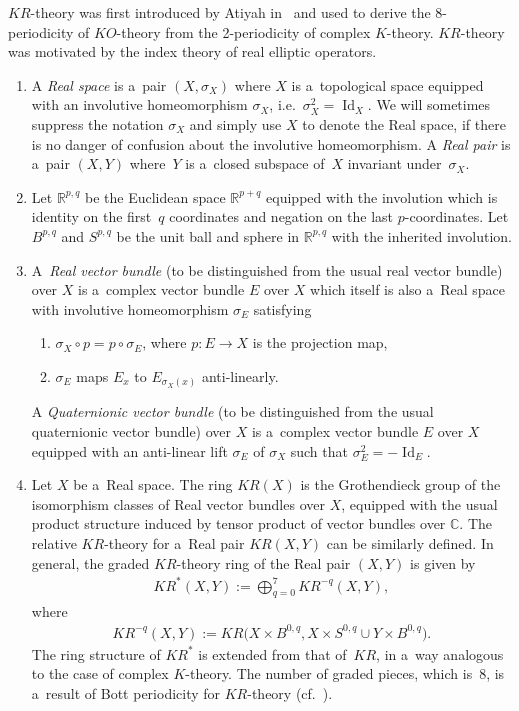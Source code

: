 \documentclass[pdftex]{sigma}
\numberwithin{equation}{section}
\DeclareMathOperator{\Id}{Id}
\begin{document}
$KR$-theory was f\/irst introduced by Atiyah in~\cite{At3} and used to derive the 8-periodicity of $KO$-theory from the
2-periodicity of complex $K$-theory.
$KR$-theory was motivated by the index theory of real elliptic operators.
\begin{Definition}\label{krtheory}\quad
\begin{enumerate}\itemsep=0pt
\item
A \emph{Real space} is a~pair $(X,
\sigma_X)$ where $X$ is a~topological space equipped with an involutive homeomorphism $\sigma_X$, i.e.\
$\sigma_X^2=\Id
_X$.
We will sometimes suppress the notation $\sigma_X$ and simply use $X$ to denote the Real space,
if there is no danger of confusion about the involutive
homeomorphism.
A \emph{Real pair}
is a~pair $(X, Y)$ where~$Y$ is a~closed subspace of~$X$ invariant under~$\sigma_X$.
\item
Let $\mathbb{R}^{p, q}$ be the Euclidean space $\mathbb{R}^{p+q}$
equipped with the involution which is identity on the f\/irst~$q$
coordinates and negation on the last $p$-coordinates.
Let $B^{p, q}$ and $S^{p, q}$ be the unit ball and sphere in $\mathbb{R}^{p, q}$ with the inherited involution.
\item
A~\emph{Real vector bundle}
(to be distinguished from the usual real vector bundle) over $X$ is a~complex vector bundle
$E$ over $X$ which itself is also a~Real space with involutive homeomorphism $\sigma_E$ satisfying
\begin{enumerate}\itemsep=0pt
\item
$\sigma_X\circ p=p\circ\sigma_E$, where $p: E\to X$ is the projection map,
\item
$\sigma_E$ maps $E_x$ to $E_{\sigma_X(x)}$ anti-linearly.
\end{enumerate}
A \emph{Quaternionic vector bundle}
(to be distinguished from the usual quaternionic vector bundle) over $X$ is a~complex
vector bundle $E$ over $X$ equipped with an anti-linear lift $\sigma_E$ of $\sigma_X$ such that $\sigma_E^2=-\Id
_E$.
\item
Let $X$ be a~Real space.
The ring $KR(X)$ is the Grothendieck group of the isomorphism classes of Real vector bundles over $X$, equipped with the
usual product structure induced by tensor product of vector bundles over $\mathbb{C}$.
The relative $KR$-theory for a~Real pair $KR(X, Y)$ can be similarly def\/ined.
In general, the graded $KR$-theory ring of the Real pair $(X, Y)$ is given by
\begin{gather*}
KR^*(X, Y):=\bigoplus_{q=0}^7 KR^{-q}(X, Y),
\end{gather*}
where
\begin{gather*}
KR^{-q}(X, Y):=KR\big(X\times B^{0,q}, X\times S^{0, q}\cup Y\times B^{0,q}\big).
\end{gather*}
The ring structure of $KR^*$ is extended from that of~$KR$, in a~way analogous to the case of complex $K$-theory.
The number of graded pieces, which is~8, is a~result of Bott periodicity for $KR$-theory (cf.~\cite{At3}).
\end{enumerate}
\end{Definition}
\end{document}
